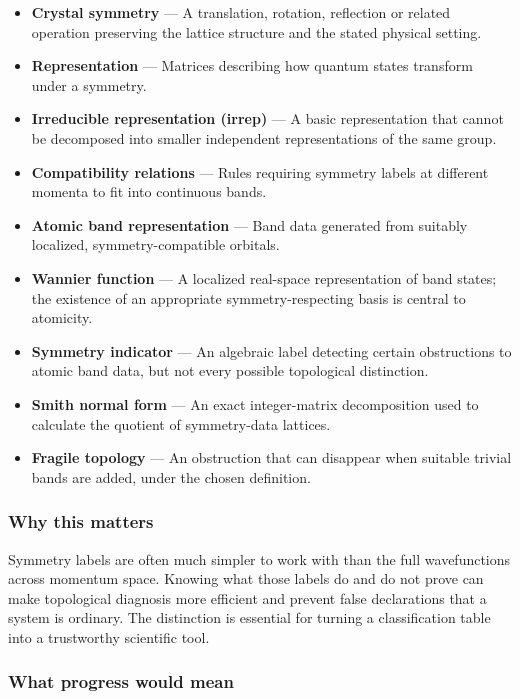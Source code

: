 \documentclass[
  11pt,
]{article}
\begin{document}
\begin{itemize}
\item
  \textbf{Crystal symmetry} --- A translation, rotation, reflection or
  related operation preserving the lattice structure and the stated
  physical setting.
\item
  \textbf{Representation} --- Matrices describing how quantum states
  transform under a symmetry.
\item
  \textbf{Irreducible representation (irrep)} --- A basic representation
  that cannot be decomposed into smaller independent representations of
  the same group.
\item
  \textbf{Compatibility relations} --- Rules requiring symmetry labels
  at different momenta to fit into continuous bands.
\item
  \textbf{Atomic band representation} --- Band data generated from
  suitably localized, symmetry-compatible orbitals.
\item
  \textbf{Wannier function} --- A localized real-space representation of
  band states; the existence of an appropriate symmetry-respecting basis
  is central to atomicity.
\item
  \textbf{Symmetry indicator} --- An algebraic label detecting certain
  obstructions to atomic band data, but not every possible topological
  distinction.
\item
  \textbf{Smith normal form} --- An exact integer-matrix decomposition
  used to calculate the quotient of symmetry-data lattices.
\item
  \textbf{Fragile topology} --- An obstruction that can disappear when
  suitable trivial bands are added, under the chosen definition.
\end{itemize}

\subsubsection{Why this matters}

Symmetry labels are often much simpler to work with than the full
wavefunctions across momentum space. Knowing what those labels do and do
not prove can make topological diagnosis more efficient and prevent
false declarations that a system is ordinary. The distinction is
essential for turning a classification table into a trustworthy
scientific tool.

\subsubsection{What progress would mean}
\end{document}
